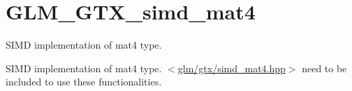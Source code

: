 \hypertarget{group__gtx__simd__mat4}{\section{G\-L\-M\-\_\-\-G\-T\-X\-\_\-simd\-\_\-mat4}
\label{group__gtx__simd__mat4}
}


S\-I\-M\-D implementation of mat4 type.  


S\-I\-M\-D implementation of mat4 type. $<$\hyperlink{simd__mat4_8hpp_source}{glm/gtx/simd\-\_\-mat4.\-hpp}$>$ need to be included to use these functionalities. 